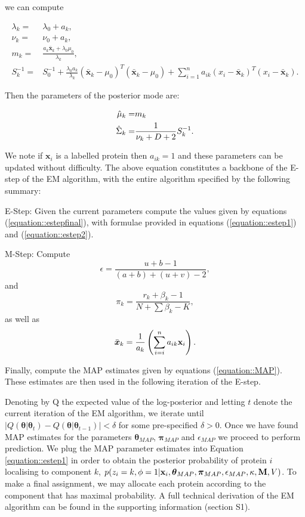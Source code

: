 \documentclass[10pt,letterpaper]{article}\usepackage[]{graphicx}\usepackage[]{color}
\begin{document}
we can compute

\begin{equation}\label{equation::Posterior}
\begin{split}
\lambda_k = &\lambda_0 + a_k, \\
\nu_k = & \nu_0 + a_k, \\
m_k = & \frac{a_k\bar{\boldsymbol{x}}_k + \lambda_0\mu_0}{\lambda_k},\\
S_k^{-1}  = & S_0^{-1} + \frac{\lambda_0 a_k}{\lambda_k}(\bar{\boldsymbol{x}}_k - \mu_0)^{T} (\bar{\boldsymbol{x}}_k - \mu_0) + \sum_{i=1}^{n} a_{ik}(x_i -\bar{\boldsymbol{x}}_k)^{T}(x_i -\bar{\boldsymbol{x}}_k).
\end{split}
\end{equation}

Then the parameters of the posterior mode are:

\begin{equation}\label{equation::MAP}
\begin{split}
\hat{{\bf\mu}}_k = &m_k \\
\hat{\Sigma}_k = &\frac{1}{\nu_k + D + 2}S_k^{-1}.
\end{split}
\end{equation}

We note if $\boldsymbol{x}_i$ is a labelled protein then $a_{ik} = 1$
and these parameters can be updated without difficulty.  The above
equation constitutes a backbone of the E-step of the EM algorithm, with
the entire algorithm specified by the following summary:


E-Step: Given the current parameters compute the values given by
equations (\ref{equation::estepfinal}), with formulae provided in
equations (\ref{equation::estep1}) and (\ref{equation::estep2}).

\bigskip

M-Step: Compute
\[\epsilon = \frac{ u + b - 1}{(a+b) + (u+v) - 2},\]
and
\[\pi_k = \frac{r_k + \beta_k - 1}{N + \sum \beta_k - K},\]
as well as
\[\bar{\boldsymbol{x}}_k = \frac{1}{a_k}\left(\sum_{i=i}^{n}a_{ik}{\bf x}_i\right).\]

Finally, compute the MAP estimates given by equations
(\ref{equation::MAP}). These estimates are then used in the following
iteration of the E-step.


Denoting by Q the expected value of the log-posterior and letting $t$
denote the current iteration of the EM algorithm, we iterate until
$\lvert Q(\boldsymbol{\theta}|\boldsymbol{\theta}_{t}) -
Q(\boldsymbol{\theta}|\boldsymbol{\theta}_{t-1})\rvert < \delta$ for
some pre-specified $\delta >0$.  Once we have found MAP estimates for
the parameters $\boldsymbol{\theta}_{MAP}$, $\boldsymbol{\pi}_{MAP}$
and $\epsilon_{MAP}$ we proceed to perform prediction. We plug the MAP
parameter estimates into Equation \eqref{equation::estep1} in order to
obtain the posterior probability of protein $i$ localising to
component $k$,
$p(z_i = k, \phi = 1 | {\bf x}_i, \boldsymbol{\theta}_{MAP},
\boldsymbol{\pi}_{MAP} , \epsilon_{MAP},\kappa, {\bf M}, V)$. To make
a final assignment, we may allocate each protein according to the
component that has maximal probability.  A full technical derivation
of the EM algorithm can be found in the supporting information (section S1).
\end{document}
